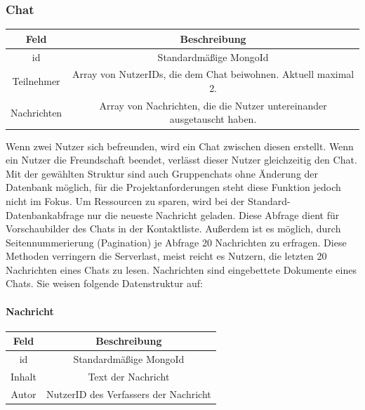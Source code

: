 \subsubsection{Chat}
\begin{center}
    \begin{tabular}{ |c|c| }
        \hline
        Feld & Beschreibung  \\
        \hline
        id & Standardmäßige MongoId \\
        Teilnehmer & Array von NutzerIDs, die dem Chat beiwohnen. Aktuell maximal 2. \\
        Nachrichten & Array von Nachrichten, die die Nutzer untereinander ausgetauscht haben. \\
        \hline
    \end{tabular}
    \cite{DB3} \cite{DB4}
\end{center}
Wenn zwei Nutzer sich befreunden, wird ein Chat zwischen diesen erstellt. Wenn ein Nutzer die Freundschaft beendet, verlässt dieser Nutzer gleichzeitig den Chat. Mit der gewählten Struktur sind auch Gruppenchats ohne Änderung der Datenbank möglich, für die Projektanforderungen steht diese Funktion jedoch nicht im Fokus.
Um Ressourcen zu sparen, wird bei der Standard-Datenbankabfrage nur die neueste Nachricht geladen. Diese Abfrage dient für Vorschaubilder des Chats in der Kontaktliste. Außerdem ist es möglich, durch Seitennummerierung (Pagination) je Abfrage 20 Nachrichten zu erfragen. Diese Methoden verringern die Serverlast, meist reicht es Nutzern, die letzten 20 Nachrichten eines Chats zu lesen.
Nachrichten sind eingebettete Dokumente eines Chats. Sie weisen folgende Datenstruktur auf:

\paragraph{Nachricht}
\begin{center}
    \begin{tabular}{ |c|c| }
        \hline
        Feld & Beschreibung  \\
        \hline
        id & Standardmäßige MongoId \\
        Inhalt & Text der Nachricht \\
        Autor & NutzerID des Verfassers der Nachricht \\
        \hline
    \end{tabular}
    \cite{DB3} \cite{DB4}
\end{center}

